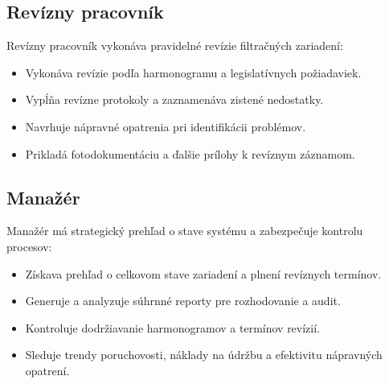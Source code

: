 \subsection{Revízny pracovník}

Revízny pracovník vykonáva pravidelné revízie filtračných zariadení:

\begin{itemize}
    \item Vykonáva revízie podľa harmonogramu a legislatívnych požiadaviek.
    \item Vypĺňa revízne protokoly a zaznamenáva zistené nedostatky.
    \item Navrhuje nápravné opatrenia pri identifikácii problémov.
    \item Prikladá fotodokumentáciu a ďalšie prílohy k revíznym záznamom.
\end{itemize}

\subsection{Manažér}

Manažér má strategický prehľad o stave systému a zabezpečuje kontrolu procesov:

\begin{itemize}
    \item Získava prehľad o celkovom stave zariadení a plnení revíznych termínov.
    \item Generuje a analyzuje súhrnné reporty pre rozhodovanie a audit.
    \item Kontroluje dodržiavanie harmonogramov a termínov revízií.
    \item Sleduje trendy poruchovosti, náklady na údržbu a efektivitu nápravných opatrení.
\end{itemize}



